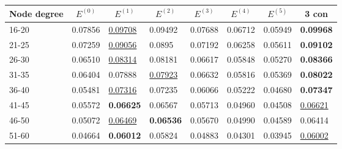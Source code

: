 \begin{table*}[]
    \centering
    \begin{tabular}{|l|l|l|l|l|l|l||l|}
        \hline
        Node degree & \multicolumn{1}{c|}{$E^{(0)}$} & \multicolumn{1}{c|}{$E^{(1)}$} & \multicolumn{1}{c|}{$E^{(2)}$} & \multicolumn{1}{c|}{$E^{(3)}$} & \multicolumn{1}{c|}{$E^{(4)}$} & \multicolumn{1}{c|}{$E^{(5)}$} & \multicolumn{1}{c|}{3 con} \\ \hline
        16-20       & 0.07856                        & \underline{0.09708}            & 0.09492                        & 0.07688                        & 0.06712                        & 0.05949                        & \textbf{0.09968}           \\ \hline
        21-25       & 0.07259                        & \underline{0.09056}            & 0.0895                         & 0.07192                        & 0.06258                        & 0.05611                        & \textbf{0.09102}           \\ \hline
        26-30       & 0.06510                        & \underline{0.08314}            & 0.08181                        & 0.06617                        & 0.05848                        & 0.05270                        & \textbf{0.08366}           \\ \hline
        31-35       & 0.06404                        & 0.07888                        & \underline{0.07923}            & 0.06632                        & 0.05816                        & 0.05369                        & \textbf{0.08022}           \\ \hline
        36-40       & 0.05481                        & \underline{0.07316}            & 0.07235                        & 0.06066                        & 0.05222                        & 0.04680                        & \textbf{0.07347}           \\ \hline
        41-45       & 0.05572                        & \textbf{0.06625}               & 0.06567                        & 0.05713                        & 0.04960                        & 0.04508                        & \underline{0.06621}        \\ \hline
        46-50       & 0.05072                        & \underline{0.06469}            & \textbf{0.06536}               & 0.05670                        & 0.04990                        & 0.04589                        & 0.06414                    \\ \hline
        51-60       & 0.04664                        & \textbf{0.06012}               & 0.05824                        & 0.04883                        & 0.04301                        & 0.03945                        & \underline{0.06002}        \\ \hline

\end{tabular}
\end{table*}
